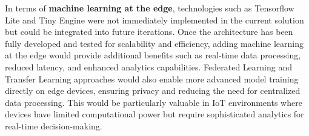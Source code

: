 In terms of \textbf{machine learning at the edge}, technologies such as Tensorflow Lite and Tiny Engine were not immediately implemented in the current solution but could be integrated into future iterations. Once the architecture has been fully developed and tested for scalability and efficiency, adding machine learning at the edge would provide additional benefits such as real-time data processing, reduced latency, and enhanced analytics capabilities. Federated Learning and Transfer Learning approaches would also enable more advanced model training directly on edge devices, ensuring privacy and reducing the need for centralized data processing. This would be particularly valuable in IoT environments where devices have limited computational power but require sophisticated analytics for real-time decision-making.
